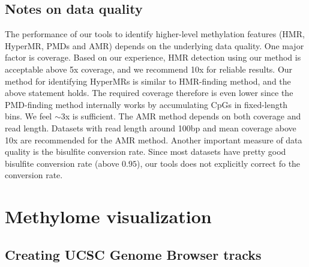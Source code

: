 \documentclass[10pt]{article}
\begin{document}
\subsection{Notes on data quality}
\label{sec:notes-data-quality}
The performance of our tools to identify higher-level methylation
features (HMR, HyperMR, PMDs and AMR) depends on the underlying data
quality. One major factor is coverage. Based on our experience, HMR
detection using our method is acceptable above 5x coverage, and we
recommend 10x for reliable results. Our method for identifying
HyperMRs is similar to HMR-finding method, and the above statement
holds. The required coverage therefore is even lower since the
PMD-finding method internally works by accumulating CpGs in
fixed-length bins. We feel $\sim$$3$x is sufficient. The AMR method
depends on both coverage and read length. Datasets with read length
around 100bp and mean coverage above 10x are recommended for the AMR
method. Another important measure of data quality is the bisulfite
conversion rate. Since most datasets have pretty good bisulfite
conversion rate (above $0.95$), our tools does not explicitly correct
fo the conversion rate.

\section{Methylome visualization}
\label{sec:visualization}


\subsection{Creating UCSC Genome Browser tracks}
\label{sec:browser}
\end{document}
